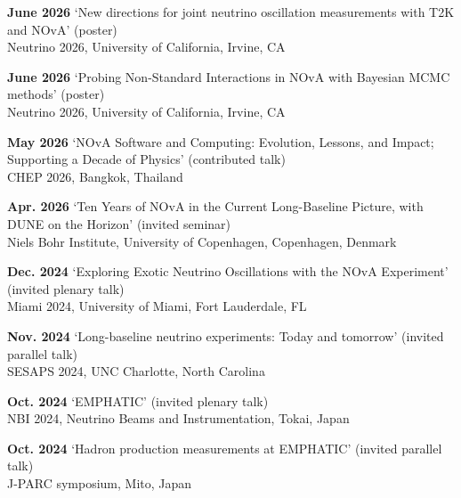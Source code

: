 \documentclass[margin, line]{res}
\renewcommand{\em}{\upshape\sffamily}
\begin{document}
\begin{resume}
{\bf June 2026} `New directions for joint neutrino oscillation measurements with T2K and NOvA' {\em (poster)}\\
Neutrino 2026, University of California, Irvine, CA\\
\vspace{-.3cm}

{\bf June 2026} `Probing Non-Standard Interactions in NOvA with Bayesian MCMC methods' {\em (poster)}\\
Neutrino 2026, University of California, Irvine, CA\\
\vspace{-.3cm}

{\bf May 2026} `NOvA Software and Computing: Evolution, Lessons, and Impact; Supporting a Decade of Physics' {\em (contributed talk)}\\
CHEP 2026, Bangkok, Thailand\\
\vspace{-.3cm}

{\bf Apr. 2026} `Ten Years of NOvA in the Current Long-Baseline Picture, with DUNE on the Horizon' {\em (invited seminar)}\\
Niels Bohr Institute, University of Copenhagen, Copenhagen, Denmark\\
\vspace{-.3cm}

{\bf Dec. 2024} `Exploring Exotic Neutrino Oscillations with the NOvA Experiment' {\em (invited plenary talk)}\\
Miami 2024, University of Miami, Fort Lauderdale, FL\\
\vspace{-.3cm}

{\bf Nov. 2024} `Long-baseline neutrino experiments: Today and tomorrow' {\em (invited parallel talk)}\\
SESAPS 2024, UNC Charlotte, North Carolina\\
\vspace{-.3cm}

{\bf Oct. 2024} `EMPHATIC' {\em (invited plenary talk)}\\
NBI 2024, Neutrino Beams and Instrumentation, Tokai, Japan\\
\vspace{-.3cm}

{\bf Oct. 2024} `Hadron production measurements at EMPHATIC' {\em (invited parallel talk)}\\
J-PARC symposium, Mito, Japan\\
\vspace{-.3cm}


\end{resume}
\end{document}
